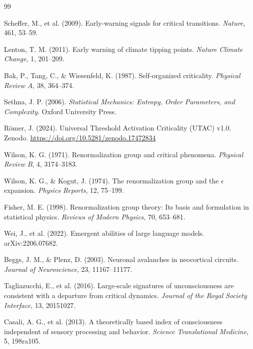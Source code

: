 \documentclass[11pt,a4paper]{article}
\begin{document}

\begin{thebibliography}{99}

Scheffer, M., et al. (2009). Early-warning signals for critical transitions. \textit{Nature}, 461, 53--59.

Lenton, T. M. (2011). Early warning of climate tipping points. \textit{Nature Climate Change}, 1, 201--209.

Bak, P., Tang, C., \& Wiesenfeld, K. (1987). Self-organized criticality. \textit{Physical Review A}, 38, 364--374.

Sethna, J. P. (2006). \textit{Statistical Mechanics: Entropy, Order Parameters, and Complexity}. Oxford University Press.

Römer, J. (2024). Universal Threshold Activation Criticality (UTAC) v1.0. Zenodo. \url{https://doi.org/10.5281/zenodo.17472834}

Wilson, K. G. (1971). Renormalization group and critical phenomena. \textit{Physical Review B}, 4, 3174--3183.

Wilson, K. G., \& Kogut, J. (1974). The renormalization group and the $\epsilon$ expansion. \textit{Physics Reports}, 12, 75--199.

Fisher, M. E. (1998). Renormalization group theory: Its basis and formulation in statistical physics. \textit{Reviews of Modern Physics}, 70, 653--681.

Wei, J., et al. (2022). Emergent abilities of large language models. arXiv:2206.07682.

Beggs, J. M., \& Plenz, D. (2003). Neuronal avalanches in neocortical circuits. \textit{Journal of Neuroscience}, 23, 11167--11177.

Tagliazucchi, E., et al. (2016). Large-scale signatures of unconsciousness are consistent with a departure from critical dynamics. \textit{Journal of the Royal Society Interface}, 13, 20151027.

Casali, A. G., et al. (2013). A theoretically based index of consciousness independent of sensory processing and behavior. \textit{Science Translational Medicine}, 5, 198ra105.

\end{thebibliography}
\end{document}
